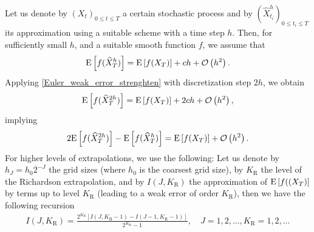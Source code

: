 Let us denote by $(X_t)_{0 \le t \le T}$ a certain stochastic process and by $(\hat{X}_{t_i}^h)_{0 \le  t_i \le T}$ its approximation using a suitable  scheme with a time step $h$.  Then, for sufficiently small $h$, and a suitable smooth function $f$, we assume that
\begin{align}\label{Euler_weak_error_strenghten}
	\mathrm{E}\left[f(\widehat{X}_T^h)\right]= \mathrm{E}\left[f(X_T)\right] + c h +{\mathcal{O}}\left(h^2\right) .
\end{align}
Applying \eqref{Euler_weak_error_strenghten} with discretization step $2h$, we  obtain
\begin{align*}
	\mathrm{E}\left[f(\widehat{X}_T^{2h})\right]= \mathrm{E}\left[f(X_T)\right] + 2 c h +{\mathcal{O}}\left(h^2\right) ,
\end{align*}
implying
\begin{align*}
	2 \mathrm{E}\left[f(\widehat{X}_T^{2h})\right]- \mathrm{E}\left[f(\widehat{X}_T^{h})\right] =\mathrm{E}\left[f(X_T)\right] + {\mathcal{O}}\left(h^2\right) .
\end{align*}
For higher levels of extrapolations, we use the following: Let us denote by $h_J=h_0 2^{-J}$ the grid sizes (where $h_0$ is the coarsest grid size), by $K_\text{R}$ the level of the Richardson extrapolation, and by $I(J,K_\text{R})$ the approximation of $\mathrm{E}\left[f((X_T)\right]$ by terms up to level $K_\text{R}$ (leading to a weak error of order $K_\text{R}$), then we have the following recursion 
\begin{align*}
I(J,K_\text{R})=\frac{2^{K_\text{R}}\left[I(J,K_\text{R}-1)-I(J-1,K_\text{R}-1)\right]}{2^{K_\text{R}}-1},\quad J=1,2,\dots, K_\text{R}=1,2,\dots
\end{align*}

